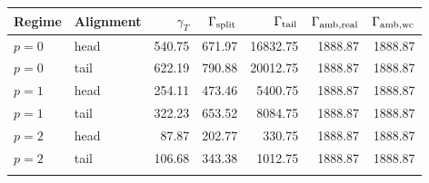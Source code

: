 \begin{tabular}{llrrrrr}
\toprule
Regime & Alignment & $\gamma_T$ & $\Gamma_{\rm split}$ & $\Gamma_{\rm tail}$ & $\Gamma_{\rm amb,real}$ & $\Gamma_{\rm amb,wc}$ \\
\midrule
$p=0$ & head & 540.75 & 671.97 & 16832.75 & 1888.87 & 1888.87 \\
$p=0$ & tail & 622.19 & 790.88 & 20012.75 & 1888.87 & 1888.87 \\
\addlinespace
$p=1$ & head & 254.11 & 473.46 & 5400.75 & 1888.87 & 1888.87 \\
$p=1$ & tail & 322.23 & 653.52 & 8084.75 & 1888.87 & 1888.87 \\
\addlinespace
$p=2$ & head & 87.87 & 202.77 & 330.75 & 1888.87 & 1888.87 \\
$p=2$ & tail & 106.68 & 343.38 & 1012.75 & 1888.87 & 1888.87 \\
\addlinespace
\bottomrule
\end{tabular}
